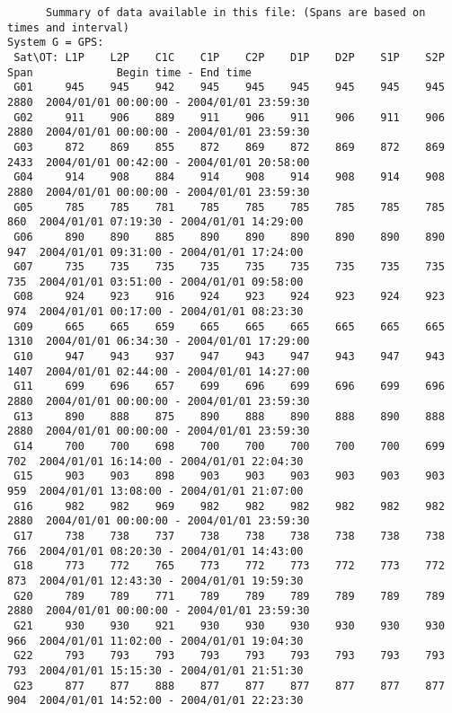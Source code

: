 \begin{\outputsize}
\begin{lstlisting}
      Summary of data available in this file: (Spans are based on times and interval)
System G = GPS:
 Sat\OT: L1P    L2P    C1C    C1P    C2P    D1P    D2P    S1P    S2P   Span             Begin time - End time
 G01     945    945    942    945    945    945    945    945    945   2880  2004/01/01 00:00:00 - 2004/01/01 23:59:30
 G02     911    906    889    911    906    911    906    911    906   2880  2004/01/01 00:00:00 - 2004/01/01 23:59:30
 G03     872    869    855    872    869    872    869    872    869   2433  2004/01/01 00:42:00 - 2004/01/01 20:58:00
 G04     914    908    884    914    908    914    908    914    908   2880  2004/01/01 00:00:00 - 2004/01/01 23:59:30
 G05     785    785    781    785    785    785    785    785    785    860  2004/01/01 07:19:30 - 2004/01/01 14:29:00
 G06     890    890    885    890    890    890    890    890    890    947  2004/01/01 09:31:00 - 2004/01/01 17:24:00
 G07     735    735    735    735    735    735    735    735    735    735  2004/01/01 03:51:00 - 2004/01/01 09:58:00
 G08     924    923    916    924    923    924    923    924    923    974  2004/01/01 00:17:00 - 2004/01/01 08:23:30
 G09     665    665    659    665    665    665    665    665    665   1310  2004/01/01 06:34:30 - 2004/01/01 17:29:00
 G10     947    943    937    947    943    947    943    947    943   1407  2004/01/01 02:44:00 - 2004/01/01 14:27:00
 G11     699    696    657    699    696    699    696    699    696   2880  2004/01/01 00:00:00 - 2004/01/01 23:59:30
 G13     890    888    875    890    888    890    888    890    888   2880  2004/01/01 00:00:00 - 2004/01/01 23:59:30
 G14     700    700    698    700    700    700    700    700    699    702  2004/01/01 16:14:00 - 2004/01/01 22:04:30
 G15     903    903    898    903    903    903    903    903    903    959  2004/01/01 13:08:00 - 2004/01/01 21:07:00
 G16     982    982    969    982    982    982    982    982    982   2880  2004/01/01 00:00:00 - 2004/01/01 23:59:30
 G17     738    738    737    738    738    738    738    738    738    766  2004/01/01 08:20:30 - 2004/01/01 14:43:00
 G18     773    772    765    773    772    773    772    773    772    873  2004/01/01 12:43:30 - 2004/01/01 19:59:30
 G20     789    789    771    789    789    789    789    789    789   2880  2004/01/01 00:00:00 - 2004/01/01 23:59:30
 G21     930    930    921    930    930    930    930    930    930    966  2004/01/01 11:02:00 - 2004/01/01 19:04:30
 G22     793    793    793    793    793    793    793    793    793    793  2004/01/01 15:15:30 - 2004/01/01 21:51:30
 G23     877    877    888    877    877    877    877    877    877    904  2004/01/01 14:52:00 - 2004/01/01 22:23:30

\end{lstlisting}
\end{\outputsize}
